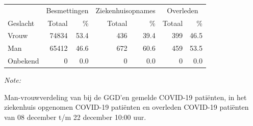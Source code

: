 \documentclass[
  english,
  man,floatsintext]{apa6}
\begin{document}
\begin{table}[H]
\centering\begingroup\fontsize{11}{13}\selectfont

\begin{threeparttable}
\begin{tabular}{lrrrrrr}
\toprule
\multicolumn{1}{c}{ } & \multicolumn{2}{c}{Besmettingen} & \multicolumn{2}{c}{Ziekenhuisopnames} & \multicolumn{2}{c}{Overleden} \\
\cmidrule(l{3pt}r{3pt}){2-3} \cmidrule(l{3pt}r{3pt}){4-5} \cmidrule(l{3pt}r{3pt}){6-7}
Geslacht & Totaal & \% & Totaal & \% & Totaal & \%\\
\midrule
Vrouw & 74834 & 53.4 & 436 & 39.4 & 399 & 46.5\\
Man & 65412 & 46.6 & 672 & 60.6 & 459 & 53.5\\
Onbekend & 0 & 0.0 & 0 & 0.0 & 0 & 0.0\\
\bottomrule
\end{tabular}
\begin{tablenotes}
\item \textit{Note: } 
\item Man-vrouwverdeling van bij de GGD’en gemelde COVID-19 patiënten, in het ziekenhuis opgenomen COVID-19 patiënten en overleden COVID-19 patiënten van 08 december t/m 22 december 10:00 uur.
\end{tablenotes}
\end{threeparttable}
\endgroup{}
\end{table}
\newpage
\end{document}
